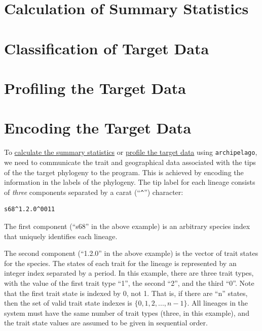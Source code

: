 \documentclass[11pt,openany]{memoir} %
\newcommand{\archipelagoPackage}{\texttt{archipelago}\xspace}
\begin{document}
\section{Calculation of Summary Statistics}
\label{sec:workflow-calculation-of-summary-statistics}

\section{Classification of Target Data}
\label{sec:workflow-classification-of-target-data}

\section{Profiling the Target Data}
\label{sec:workflow-profiling-the-target-data}

\section{Encoding the Target Data}
\label{sec:workflow-encoding-the-target-data}

To \hyperref[sec:workflow-calculation-of-summary-statistics]{calculate the summary statistics} or \hyperref[sec:workflow-profiling-the-target-data]{profile the target data} using \archipelagoPackage, we need to communicate the trait and geographical data associated with the tips of the the target phylogeny to the program.
This is achieved by encoding the information in the labels of the phylogeny.
The tip label for each lineage consists of \textit{three} components separated by a carat (``\verb+^+'') character:

\begin{lstlisting}
s68^1.2.0^0011
\end{lstlisting}

The first component (``s68'' in the above example) is an arbitrary species index that uniquely identifies each lineage.

The second component (``1.2.0'' in the above example) is the vector of trait states for the species.
The states of each trait for the lineage is represented by an integer index separated by a period.
In this example, there are three trait types, with the value of the first trait type ``1'', the second ``2'', and the third ``0''.
Note that the first trait state is indexed by 0, not 1.
That is, if there are ``n'' states, then the set of valid trait state indexes is $\{0, 1, 2, ..., n-1\}$.
All lineages in the system must have the same number of trait types (three, in this example), and the trait state values are assumed to be given in sequential order.
\end{document}
